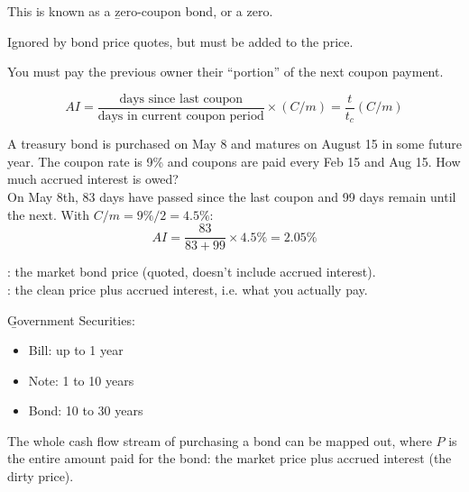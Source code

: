 This is known as a \b{zero-coupon bond}, or a zero.

Ignored by bond price quotes, but must be added to the price.

\begin{center}
\end{center}

You must pay the previous owner their ``portion'' of the next coupon payment.

\[\boxed{AI = \frac{\text{days since last coupon}}{\text{days in current coupon period}} \times (C/m) = \frac{t}{t_c}(C/m)}\]

\begin{example}
    A treasury bond is purchased on May 8 and matures on August 15 in some future year. The coupon rate is 9\% and coupons are paid every Feb 15 and Aug 15. How much accrued interest is owed?
    \\On May 8th, 83 days have passed since the last coupon and 99 days remain until the next. With $C/m = 9\%/2 = 4.5\%$:
    \[AI = \frac{83}{83+99}\times 4.5\% = 2.05\%\]
\end{example}

\begin{definition}
    : the market bond price (quoted, doesn't include accrued interest).
    \\: the clean price plus accrued interest, i.e. what you actually pay.
\end{definition}

\b{Government Securities}:
\begin{itemize}
    \item Bill: up to 1 year
    \item Note: 1 to 10 years
    \item Bond: 10 to 30 years
\end{itemize}

The whole cash flow stream of purchasing a bond can be mapped out, where $P$ is the entire amount paid for the bond: the market price plus accrued interest (the dirty price).

